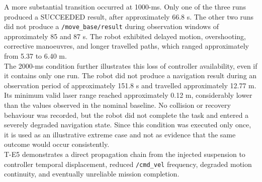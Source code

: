 A more substantial transition occurred at 1000-ms. Only one of the three runs produced a SUCCEEDED result, after approximately 66.8 s. The other two runs did not produce a \texttt{/move\_base/result} during observation windows of approximately 85 and 87 s. The robot exhibited delayed motion, overshooting, corrective manoeuvres, and longer travelled paths, which ranged approximately from 5.37 to 6.40 m.
\\
The 2000-ms condition further illustrates this loss of controller availability, even if it contains only one run. The robot did not produce a navigation result during an observation period of approximately 151.8 s and travelled approximately 12.77 m. Its minimum valid laser range reached approximately 0.12 m, considerably lower than the values observed in the nominal baseline. No collision or recovery behaviour was recorded, but the robot did not complete the task and entered a severely degraded navigation state. Since this condition was executed only once, it is used as an illustrative extreme case and not as evidence that the same outcome would occur consistently.
\\
T-E5 demonstrates a direct propagation chain from the injected suspension to controller temporal displacement, reduced \texttt{/cmd\_vel} frequency, degraded motion continuity, and eventually unreliable mission completion.

